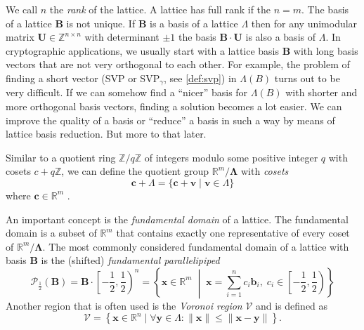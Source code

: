 We call $n$ the \textit{rank} of the lattice. A lattice has full rank if the $n=m$. The basis of a lattice $\mathbf{B}$ is not unique. If $\mathbf{B}$ is a basis of a lattice $\Lambda$ then for any unimodular matrix $\mathbf{U}\in \mathbb{Z}^{n\times n}$ with determinant $\pm 1$ the basis $\mathbf{B}\cdot \mathbf{U}$ is also a basis of $\Lambda$. In cryptographic applications, we usually start with a lattice basis $\mathbf{B}$ with long basis vectors that are not very orthogonal to each other. For example, the problem of finding a short vector (SVP or SVP$_\gamma$, see \cref{def:svp}) in $\Lambda(B)$ turns out to be very difficult. If we can somehow find a ``nicer'' basis for $\Lambda(B)$ with shorter and more orthogonal basis vectors, finding a solution becomes a lot easier. We can improve the quality of a basis or ``reduce'' a basis in such a way by means of lattice basis reduction. But more to that later.


Similar to a quotient ring $\mathbb{Z}/q\mathbb{Z}$ of integers modulo some positive integer $q$ with cosets $c + q\mathbb{Z}$, we can define the quotient group $\mathbb{R}^m/\mathbf{\Lambda}$ with \textit{cosets}
\begin{equation}
    \mathbf{c} + \Lambda = \{\mathbf{c} + \mathbf{v} \mid \mathbf{v}\in \Lambda\}
\end{equation}
where $\mathbf{c} \in \mathbb{R}^m$ \cite{Pei16}. %

An important concept is the \textit{fundamental domain} of a lattice. The fundamental domain is a subset of $\mathbb{R}^m$ that contains exactly one representative of every coset of $\mathbb{R}^m/\mathbf{\Lambda}$. The most commonly considered fundamental domain of a lattice with basis $\mathbf{B}$ is the (shifted) \textit{fundamental parallelipiped}
\begin{equation} \label{eq:fundamental-parallelipiped}
    \mathcal{P}_{\frac{1}{2}}(\mathbf{B}) = \mathbf{B} \cdot \left[ - \frac{1}{2}, \frac{1}{2}\right)^n = \left\{ \mathbf{x} \in \mathbb{R}^m \;\middle|\; \mathbf{x} = \sum_{i=1}^n c_i \mathbf{b}_i, \; c_i \in  \left[ - \frac{1}{2}, \frac{1}{2}\right) \right\}
\end{equation}
Another region that is often used is the \textit{Voronoi region} $\mathcal{V}$ \cite{GJS15} and is defined as
\begin{equation}\label{eq:voronoi-region}
    \mathcal{V} = \left\{ \mathbf{x} \in \mathbb{R}^n \mid \forall \mathbf{y} \in \Lambda : \| \mathbf{x} \| \leq \| \mathbf{x} - \mathbf{y} \| \right\}.
\end{equation}

